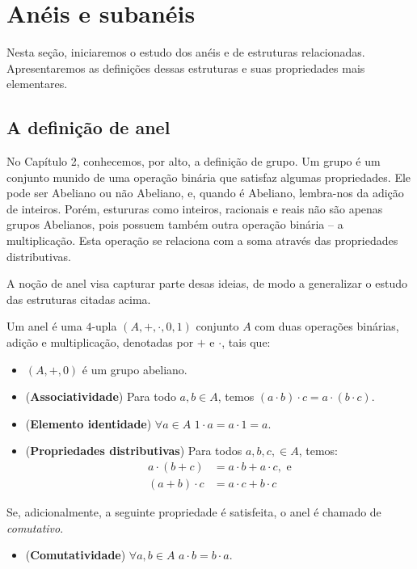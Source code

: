
\chapter{Anéis e subanéis}
Nesta seção, iniciaremos o estudo dos anéis e de estruturas relacionadas. Apresentaremos as definições dessas estruturas e suas propriedades mais elementares.

\section{A definição de anel}
No Capítulo 2, conhecemos, por alto, a definição de grupo.
Um grupo é um conjunto munido de uma operação binária que satisfaz algumas propriedades.
Ele pode ser Abeliano ou não Abeliano, e, quando é Abeliano, lembra-nos da adição de inteiros.
Porém, estururas como inteiros, racionais e reais não são apenas grupos Abelianos, pois possuem também outra operação binária -- a multiplicação.
Esta operação se relaciona com a soma através das propriedades distributivas.

A noção de anel visa capturar parte desas ideias, de modo a generalizar o estudo das estruturas citadas acima.
\begin{definition}[Anel]
    Um anel é uma $4$-upla $(A, +, \cdot, 0, 1)$ conjunto $A$ com duas operações binárias, adição e multiplicação, denotadas por $+$ e $\cdot$, tais que:
    \begin{itemize}
        \item $(A, +, 0)$ é um grupo abeliano.
        \item (\textbf{Associatividade}) Para todo $a, b \in A$, temos $(a \cdot b)\cdot c = a\cdot(b\cdot c)$.
        \item (\textbf{Elemento identidade}) $\forall a \in A$ $1 \cdot a = a \cdot 1 = a$.
        \item (\textbf{Propriedades distributivas}) Para todos $a, b, c, \in A$, temos:
        \begin{align*}
            a \cdot (b + c) &= a \cdot b + a \cdot c, \text{ e}\\
            (a + b) \cdot c &= a \cdot c + b \cdot c
        \end{align*}
    \end{itemize}
    Se, adicionalmente, a seguinte propriedade é satisfeita, o anel é chamado de \emph{comutativo}.
    \begin{itemize}
        \item (\textbf{Comutatividade}) $\forall a, b \in A$ $a \cdot b = b \cdot a$.
    \end{itemize}
\end{definition}

